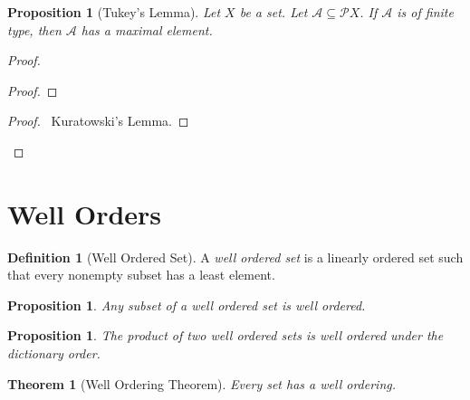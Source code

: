 \documentclass{book}
\let\qed\relax
\newtheorem{prop}[ax]{Proposition}
\newtheorem{thm}[ax]{Theorem}
\theoremstyle{definition}
\newtheorem{df}[ax]{Definition}
\begin{document}
\begin{prop}[Tukey's Lemma]
Let $X$ be a set. Let $\mathcal{A} \subseteq \mathcal{P} X$. If $\mathcal{A}$ is of finite type, then $\mathcal{A}$ has a maximal element.
\end{prop}

\begin{proof}
\pf
{}
\begin{proof}
\end{proof}
\qedstep
\begin{proof}
	\pf\ Kuratowski's Lemma.
\end{proof}
\qed
\end{proof}

\section{Well Orders}

\begin{df}[Well Ordered Set]
A \emph{well ordered set} is a linearly ordered set such that every nonempty subset has a least element.
\end{df}

\begin{prop}
Any subset of a well ordered set is well ordered.
\end{prop}

\begin{prop}
The product of two well ordered sets is well ordered under the dictionary order.
\end{prop}

\begin{thm}[Well Ordering Theorem]
Every set has a well ordering.
\end{thm}
\end{document}
